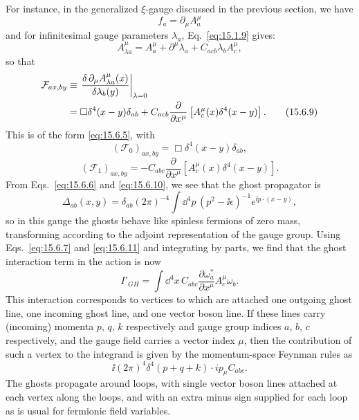 For instance, in the generalized $\xi$-gauge discussed in the previous
section, we have
\begin{equation}
  f_a=\partial_\mu A_a^\mu
  \tag{15.6.8}\label{eq:15.6.8}
\end{equation}
and for infinitesimal gauge parameters $\lambda_a$, Eq.~\eqref{eq:15.1.9}
gives:
\begin{equation*}
  A_{\lambda a}^\mu
  =A_a^\mu+\partial^\mu\lambda_a
  +C_{acb}\lambda_b A_c^\mu,
\end{equation*}
so that
\begin{align}
  \mathcal F_{a x,b y}
  &\equiv\left.\frac{\delta\,\partial_\mu A_{\lambda a}^\mu(x)}
  {\delta\lambda_b(y)}\right|_{\lambda=0}
  \notag\\
  &=\Box\delta^4(x-y)\delta_{ab}
  +C_{acb}\frac{\partial}{\partial x^\mu}
  \left[A_c^\mu(x)\delta^4(x-y)\right].
  \tag{15.6.9}\label{eq:15.6.9}
\end{align}
This is of the form \eqref{eq:15.6.5}, with
\begin{equation}
  (\mathcal F_0)_{a x,b y}
  =\Box\delta^4(x-y)\delta_{ab},
  \tag{15.6.10}\label{eq:15.6.10}
\end{equation}
\begin{equation}
  (\mathcal F_1)_{a x,b y}
  =-C_{abc}\frac{\partial}{\partial x^\mu}
  \left[A_c^\mu(x)\delta^4(x-y)\right].
  \tag{15.6.11}\label{eq:15.6.11}
\end{equation}
From Eqs.~\eqref{eq:15.6.6} and \eqref{eq:15.6.10}, we see that the ghost
propagator is
\begin{equation}
  \Delta_{ab}(x,y)=\delta_{ab}(2\pi)^{-4}
  \int \dd^4p\,(p^2-\ii\epsilon)^{-1}e^{\ii p\cdot(x-y)},
  \tag{15.6.12}\label{eq:15.6.12}
\end{equation}
so in this gauge the ghosts behave like spinless fermions of zero mass,
transforming according to the adjoint representation of the gauge group.
Using Eqs.~\eqref{eq:15.6.7} and \eqref{eq:15.6.11} and integrating by parts,
we find that the ghost interaction term in the action is now
\begin{equation}
  I'_{GH}=\int \dd^4x\,C_{abc}
  \frac{\partial\omega_a^*}{\partial x^\mu}
  A_c^\mu\omega_b.
  \tag{15.6.13}\label{eq:15.6.13}
\end{equation}
This interaction corresponds to vertices to which are attached one outgoing
ghost line, one incoming ghost line, and one vector boson line. If these lines
carry (incoming) momenta $p$, $q$, $k$ respectively and gauge group indices
$a$, $b$, $c$ respectively, and the gauge field carries a vector
index $\mu$, then the contribution of such a vertex to the integrand is given
by the momentum-space Feynman rules as
\begin{equation}
  \ii(2\pi)^4\delta^4(p+q+k)\mathbin{\cdot}ip_\mu C_{abc}.
  \tag{15.6.14}\label{eq:15.6.14}
\end{equation}
The ghosts propagate around loops, with single vector boson lines attached at
each vertex along the loops, and with an extra minus sign supplied for each
loop as is usual for fermionic field variables.

